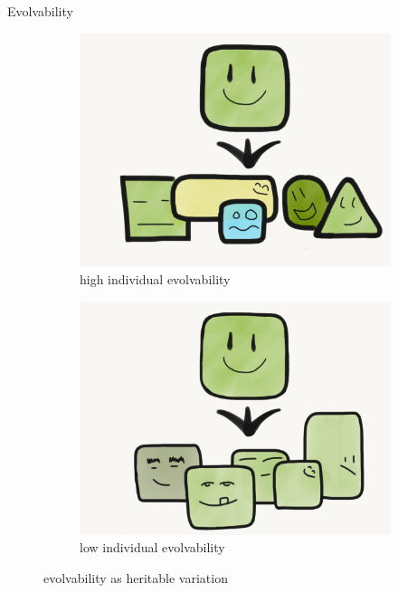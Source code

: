 \begin{frame}{Evolvability}
\begin{figure}
 \centering
    \begin{subfigure}[b]{0.5\textwidth}
        \centering
    	\includegraphics[width=\textwidth]{img/individual_evolvability.png}
        \caption{high individual evolvability}
        \label{subfig:canalization}
    \end{subfigure}%
    \hfill
    \begin{subfigure}[b]{0.5\textwidth}
        \centering
        \includegraphics[width=\textwidth]{img/low_individual_evolvability.png}
        \caption{low individual evolvability}
        \label{subfig:no_canalization}
    \end{subfigure}
 	\captionsetup{singlelinecheck=off,justification=raggedright}
    \vspace{-4ex}
  \captionsetup{singlelinecheck=off,justification=raggedright}
  \caption{evolvability as heritable variation}
\end{figure}
\end{frame}


